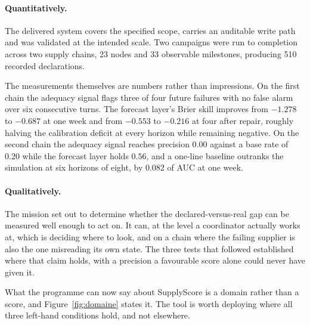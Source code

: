 \paragraph{Quantitatively.}
The delivered system covers the specified scope, carries an auditable write path and was
validated at the intended scale. Two campaigns were run to completion across two supply
chains, 23 nodes and 33 observable milestones, producing 510 recorded declarations.

The measurements themselves are numbers rather than impressions. On the first chain the
adequacy signal flags three of four future failures with no false alarm over six consecutive
turns. The forecast layer's Brier skill improves from $-1.278$ to $-0.687$ at one week and
from $-0.553$ to $-0.216$ at four after repair, roughly halving the calibration deficit at
every horizon while remaining negative. On the second chain the adequacy signal reaches
precision $0.00$ against a base rate of $0.20$ while the forecast layer holds $0.56$, and a
one-line baseline outranks the simulation at six horizons of eight, by $0.082$ of AUC at one
week.

\paragraph{Qualitatively.}
The mission set out to determine whether the declared-versus-real gap can be measured well
enough to act on. It can, at the level a coordinator actually works at, which is deciding
where to look, and on a chain where the failing supplier is also the one misreading its own
state. The three tests that followed established where that claim holds, with a precision a
favourable score alone could never have given it.

What the programme can now say about SupplyScore is a domain rather than a score, and
Figure~\ref{fig:domaine} states it. The tool is worth deploying where all three left-hand
conditions hold, and not elsewhere.

